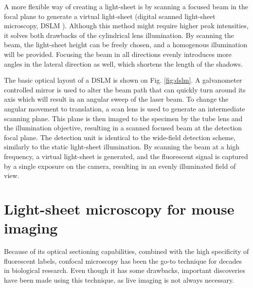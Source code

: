     A more flexible way of creating a light-sheet is by scanning a focused beam in the focal plane to generate a virtual light-sheet (digital scanned light-sheet microscopy, DSLM \cite{keller_reconstruction_2008}). Although this method might require higher peak intensities, it solves both drawbacks of the cylindrical lens illumination. By scanning the beam, the light-sheet height can be freely chosen, and a homogenous illumination will be provided. Focusing the beam in all directions evenly introduces more angles in the lateral direction as well, which shortens the length of the shadows.
    
    The basic optical layout of a DSLM is shown on Fig. \ref{fig:dslm}. A galvanometer controlled mirror is used to alter the beam path that can quickly turn around its axis which will result in an angular sweep of the laser beam. To change the angular movement to translation, a scan lens is used to generate an intermediate scanning plane. This plane is then imaged to the specimen by the tube lens and the illumination objective, resulting in a scanned focused beam at the detection focal plane. The detection unit is identical to the wide-field detection scheme, similarly to the static light-sheet illumination. By scanning the beam at a high frequency, a virtual light-sheet is generated, and the fluorescent signal is captured by a single exposure on the camera, resulting in an evenly illuminated field of view.

  



  



\section{Light-sheet microscopy for mouse imaging}

  Because of its optical sectioning capabilities, combined with the high specificity of fluorescent labels, confocal microscopy has been the go-to technique for decades in biological research. Even though it has some drawbacks, important discoveries have been made using this technique, as live imaging is not always necessary.

